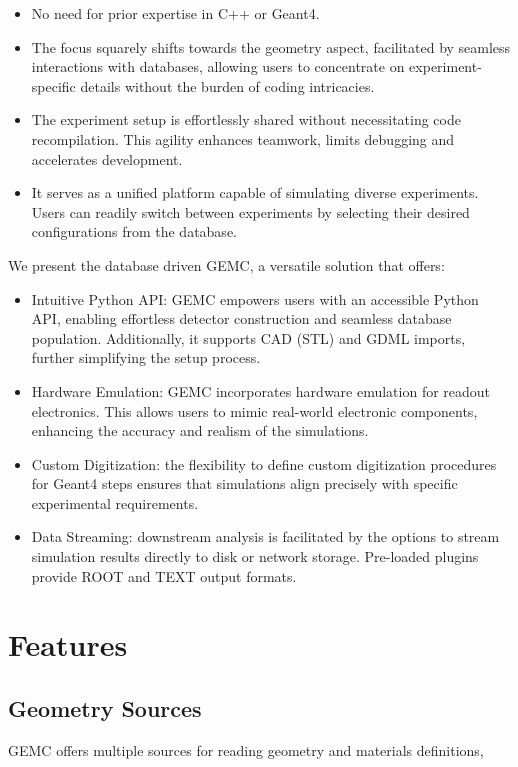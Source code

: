 \begin{itemize}
    \item No need for prior expertise in C++ or Geant4.
    \item The focus squarely shifts towards
    the geometry aspect, facilitated by seamless interactions with databases,
    allowing users to concentrate on experiment-specific details without the burden of coding intricacies.
    \item The experiment setup is effortlessly shared without necessitating code recompilation.
    This agility enhances teamwork, limits debugging and accelerates development.
    \item It serves as a unified platform capable of simulating diverse experiments.
    Users can readily switch between experiments by selecting their desired configurations from the database.
\end{itemize}

\newpage
We present the database driven GEMC\cite{clas12_gemc, gemc_homepage}, a versatile solution that offers:

\begin{itemize}
    \item Intuitive Python API: GEMC empowers users with an accessible Python API, enabling
    effortless detector construction and seamless database population.
    Additionally, it supports CAD (STL) and GDML imports, further simplifying the setup process.
    \item Hardware Emulation: GEMC incorporates hardware emulation for readout electronics.
    This allows users to mimic real-world electronic components, enhancing the accuracy and realism of
    the simulations.
    \item Custom Digitization: the flexibility to define custom digitization procedures for Geant4 steps
    ensures that simulations align precisely with specific experimental requirements.
    \item Data Streaming: downstream analysis is facilitated by the options to stream simulation results directly
    to disk or network storage.
    Pre-loaded plugins provide ROOT and TEXT output formats.
\end{itemize}


\section{Features}
\label{sec:features}

\subsection{Geometry Sources}
\label{subsec:databases}
GEMC offers multiple sources for reading geometry and materials definitions,

